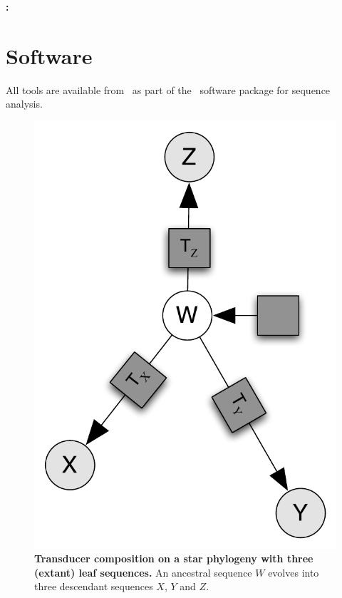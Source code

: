 \documentclass[10pt]{article}
\date{}
\begin{document}
\begin{flushleft}
  {\Large
    \textbf{\titlestring: }
  }
\\
\authorstring
\end{flushleft}


\newpage
\section{Software}

All tools are available from \darturl\ as part of the \dart\ software package for sequence analysis.

 \begin{figure}[!ht]
   \centering
  \includegraphics [scale=0.4] {figs/threeway.pdf}
   \caption{
     \textbf{Transducer composition on a star phylogeny with three
       (extant) leaf sequences.}
     An ancestral sequence $W$ evolves into three descendant sequences $X$, $Y$ and $Z$.
}
\end{figure}
\end{document}
